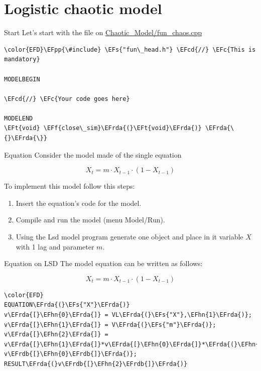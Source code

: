 \documentclass[bigger,aspectratio=169]{beamer}
\newcommand{\EFc}[1]{\textcolor{EFc}{#1}} %
\newcommand{\EFcd}[1]{\textcolor{EFcd}{#1}} %
\newcommand{\EFs}[1]{\textcolor{EFs}{#1}} %
\newcommand{\EFf}[1]{\textcolor{EFf}{#1}} %
\newcommand{\EFt}[1]{\textcolor{EFt}{#1}} %
\newcommand{\EFpp}[1]{\textcolor{EFpp}{\textbf{#1}}} %
\newcommand{\EFhn}[1]{\textcolor{EFhn}{\textbf{#1}}} %
\newcommand{\EFrda}[1]{\textcolor{EFrda}{#1}} %
\newcommand{\EFrdb}[1]{\textcolor{EFrdb}{#1}} %
\begin{document}
\section{Logistic chaotic model}
\label{sec:orge3e7b57}

\begin{frame}[label={sec:org462c115},fragile]{Start}
 Let's start with the file on \url{Chaotic\_Model/fun\_chaos.cpp}


\begin{Code}
\begin{Verbatim}
\color{EFD}\EFpp{\#include} \EFs{"fun\_head.h"} \EFcd{//} \EFc{This is mandatory}

MODELBEGIN

\EFcd{//} \EFc{Your code goes here}

MODELEND
\EFt{void} \EFf{close\_sim}\EFrda{(}\EFt{void}\EFrda{)} \EFrda{\{}\EFrda{\}}
\end{Verbatim}
\end{Code}
\end{frame}
\begin{frame}[label={sec:org2bbba02}]{Equation}
Consider the model made of the single equation

\[X_{t} = m\cdot X_{t-1}\cdot (1 - X_{t-1})\]

To implement this model follow this steps:
\begin{enumerate}
\item Insert the equation’s code for the model.
\item Compile and run the model (menu \alert{Model/Run}).
\item Using the Lsd model program generate one object and place in it variable \(X\) with 1 lag and parameter \(m\).
\end{enumerate}
\end{frame}
\begin{frame}[label={sec:org2f8b8c8},fragile]{Equation on LSD}
 The model equation can be written as follows:

\[X_{t} = m\cdot X_{t-1}\cdot (1 - X_{t-1})\]

\begin{Code}
\begin{Verbatim}
\color{EFD}
EQUATION\EFrda{(}\EFs{"X"}\EFrda{)}
v\EFrda{[}\EFhn{0}\EFrda{]} = VL\EFrda{(}\EFs{"X"},\EFhn{1}\EFrda{)};
v\EFrda{[}\EFhn{1}\EFrda{]} = V\EFrda{(}\EFs{"m"}\EFrda{)};
v\EFrda{[}\EFhn{2}\EFrda{]} = v\EFrda{[}\EFhn{1}\EFrda{]}*v\EFrda{[}\EFhn{0}\EFrda{]}*\EFrda{(}\EFhn{1}-v\EFrdb{[}\EFhn{0}\EFrdb{]}\EFrda{)};
RESULT\EFrda{(}v\EFrdb{[}\EFhn{2}\EFrdb{]}\EFrda{)}
\end{Verbatim}
\end{Code}
\end{frame}
\end{document}
